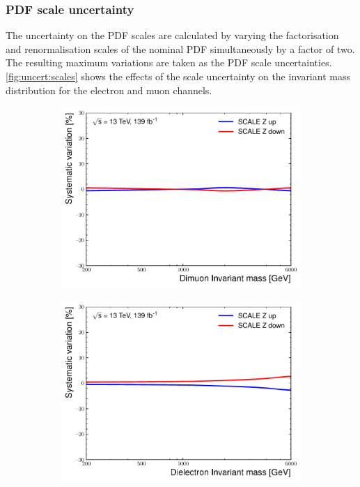\subsubsection{PDF scale uncertainty}
The uncertainty on the PDF scales are calculated by varying the factorisation and renormalisation scales of the nominal PDF simultaneously by a factor of two. The resulting maximum variations are taken as the PDF scale uncertainties. \cref{fig:uncert:scales} shows the effects of the scale uncertainty on the invariant mass distribution for the electron and muon channels. 

\begin{figure}[h!]
    \centering
    \begin{subfigure}[h]{0.42\textwidth}
        \centering
        \includegraphics[width=\textwidth]{figures/analysis/datamc/Uncertainties/theory/mm/backgroundTemplate_KF_SCALE_Z__1up.pdf}
        \label{fig:uncert:mmscaleZ}
    \end{subfigure}
    \begin{subfigure}[h]{0.42\textwidth}
        \centering
        \includegraphics[width=\textwidth]{figures/analysis/datamc/Uncertainties/theory/ee/backgroundTemplate_KF_SCALE_Z__1up.pdf}

\end{subfigure}
\end{figure}
